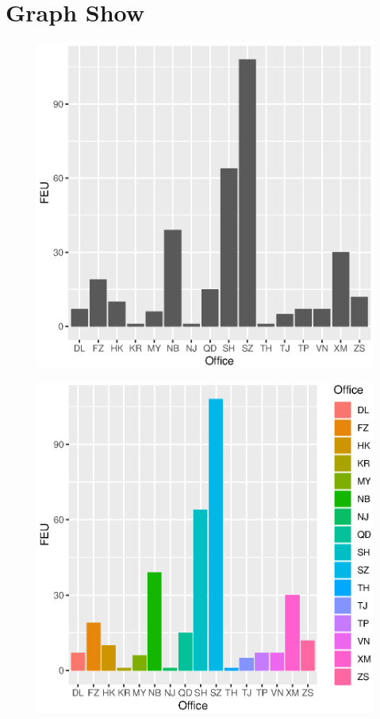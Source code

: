 \documentclass[a4paper]{article}
\begin{document}
	\section*{Graph Show}
		\begin{figure}
		\begin{center}
		\includegraphics{Rplot01}
		\end{center}
		\end{figure}
		\begin{figure}
		\begin{center}
		\includegraphics{Rplot02}
		\end{center}
		\end{figure}
\end{document}
